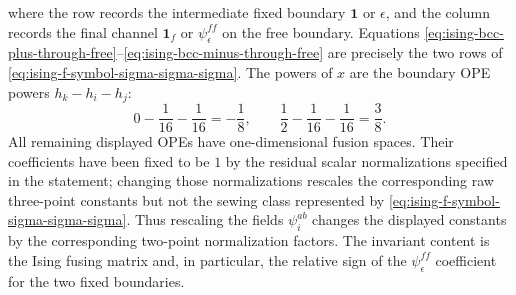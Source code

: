 where the row records the intermediate fixed boundary
\(\mathbf 1\) or \(\epsilon\), and the column records the final channel
\(\mathbf 1_f\) or \(\psi_\epsilon^{ff}\) on the free boundary.  Equations
\eqref{eq:ising-bcc-plus-through-free}--\eqref{eq:ising-bcc-minus-through-free}
are precisely the two rows of
\eqref{eq:ising-f-symbol-sigma-sigma-sigma}.  The powers of \(x\) are the
boundary OPE powers \(h_k-h_i-h_j\):
\[
  0-\frac1{16}-\frac1{16}=-\frac18,\qquad
  \frac12-\frac1{16}-\frac1{16}=\frac38 .
\]
All remaining displayed OPEs have one-dimensional fusion spaces.  Their
coefficients have been fixed to be \(1\) by the residual scalar
normalizations specified in the statement; changing those normalizations
rescales the corresponding raw three-point constants but not the sewing
class represented by \eqref{eq:ising-f-symbol-sigma-sigma-sigma}.
Thus rescaling the fields \(\psi_i^{ab}\) changes the displayed constants by
the corresponding two-point normalization factors.  The invariant content is
the Ising fusing matrix and, in particular, the relative sign of the
\(\psi_\epsilon^{ff}\) coefficient for the two fixed boundaries.

